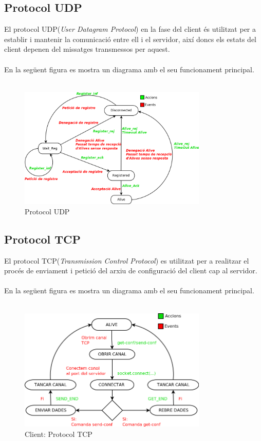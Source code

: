 \documentclass[11pt]{article}
\begin{document}
\subsection{Protocol UDP}	
El protocol UDP(\textit{User Datagram Protocol}) en la fase del client és utilitzat per a establir i mantenir la comunicació entre ell i el servidor, així doncs els estats del client depenen del missatges transmessos per aquest.\\\\
En la següent figura es mostra un diagrama amb el seu funcionament principal.
\\\\
\begin{figure}[h]
    \centering
    \includegraphics[width=0.8\textwidth]{UDP_diagram.png}
    \caption{Protocol UDP}
    \label{fig:ProtcolUDP}
\end{figure}
\newpage
\subsection{Protocol TCP}
El protocol TCP(\textit{Transmission Control Protocol}) es utilitzat per a realitzar el procés de enviament i petició del arxiu de configuració del client cap al servidor.
\\\\
En la següent figura es mostra un diagrama amb el seu funcionament principal.
\\\\
\begin{figure}[h]
    \centering
    \includegraphics[width=0.8\textwidth]{clientTCP.png}
    \caption{Client: Protocol TCP}
    \label{fig:PrtocolTCP}
\end{figure}
\newpage
\justify
\end{document}
